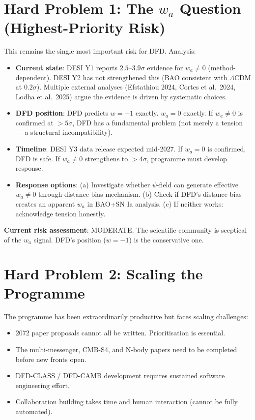 \documentclass[11pt,a4paper]{article}
\begin{document}
\section{Hard Problem 1: The $w_a$ Question (Highest-Priority Risk)}

This remains the single most important risk for DFD. Analysis:

\begin{itemize}[nosep]
\item \textbf{Current state}: DESI Y1 reports $2.5$--$3.9\sigma$ evidence for $w_a \neq 0$ (method-dependent). DESI Y2 has not strengthened this (BAO consistent with $\Lambda$CDM at $0.2\sigma$). Multiple external analyses (Efstathiou 2024, Cortes et al.\ 2024, Lodha et al.\ 2025) argue the evidence is driven by systematic choices.

\item \textbf{DFD position}: DFD predicts $w = -1$ exactly. $w_a = 0$ exactly. If $w_a \neq 0$ is confirmed at $> 5\sigma$, DFD has a fundamental problem (not merely a tension --- a structural incompatibility).

\item \textbf{Timeline}: DESI Y3 data release expected mid-2027. If $w_a = 0$ is confirmed, DFD is safe. If $w_a \neq 0$ strengthens to $> 4\sigma$, programme must develop response.

\item \textbf{Response options}: (a) Investigate whether $\psi$-field can generate effective $w_a \neq 0$ through distance-bias mechanism. (b) Check if DFD's distance-bias creates an apparent $w_a$ in BAO+SN Ia analysis. (c) If neither works: acknowledge tension honestly.
\end{itemize}

\textbf{Current risk assessment}: MODERATE. The scientific community is sceptical of the $w_a$ signal. DFD's position ($w = -1$) is the conservative one.

\section{Hard Problem 2: Scaling the Programme}

The programme has been extraordinarily productive but faces scaling challenges:
\begin{itemize}[nosep]
\item 2072 paper proposals cannot all be written. Prioritisation is essential.
\item The multi-messenger, CMB-S4, and N-body papers need to be completed before new fronts open.
\item DFD-CLASS / DFD-CAMB development requires sustained software engineering effort.
\item Collaboration building takes time and human interaction (cannot be fully automated).
\end{itemize}
\end{document}
